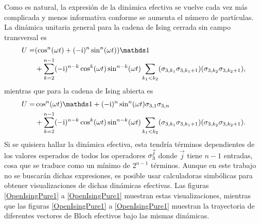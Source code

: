 Como es natural, la expresión de la dinámica efectiva se vuelve cada vez más complicada y menos informativa conforme se aumenta el número de partículas. La dinámica unitaria general para la cadena de Ising cerrada sin campo transversal es
\begin{align}
    U=&\qty(\cos^{n}(\omega t)+(-\rmi)^{n}\sin^{n}(\omega t))\Id\nonumber\\ 
    &+\sum_{k=2}^{n-1}(-\rmi)^{n-k}\cos^{k}(\omega t)\sin^{n-k}(\omega t)\sum_{k_{1}<k_{2}}(\pauli{3,k_{1}}\pauli{3,k_{1}+1})(\pauli{3,k_{2}}\pauli{3,k_{2}+1}),\nonumber
\end{align}
mientras que para la cadena de Ising abierta es
\begin{align}
    U=&\cos^{n}(\omega t)\Id+(-\rmi)^{n}\sin^{n}(\omega t)\pauli{3,1}\pauli{3,n}\nonumber\\ 
    &+\sum_{k=2}^{n-1}(-\rmi)^{n-k}\cos^{k}(\omega t)\sin^{n-k}(\omega t)\sum_{k_{1}<k_{2}}(\pauli{3,k_{1}}\pauli{3,k_{1}+1})(\pauli{3,k_{2}}\pauli{3,k_{2}+1}).\nonumber
\end{align}
Si se quisiera hallar la dinámica efectiva, esta tendría términos dependientes de los valores esperados de todos los operadores $\sigma_{3}^{\vec{j}}$ donde $\vec{j}$ tiene $n-1$ entradas, cosa que se traduce como un mínimo de $2^{n-1}$ términos. Aunque en este trabajo no se buscarán dichas expresiones, es posible usar calculadoras simbólicas para obtener visualizaciones de dichas dinámicas efectivas. Las figuras \ref{OpenIsingPure1} a \ref{OpenIsingPure1} muestran estas visualizaciones, mientras que las figuras \ref{OpenIsingPure1} a \ref{OpenIsingPure1} muestran la trayectoria de diferentes vectores de Bloch efectivos bajo las mismas dinámicas.

